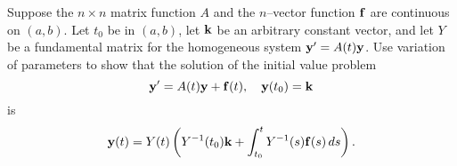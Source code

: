 \documentclass{ximera}
\begin{document}
 \begin{problem}\label{exer:10.7.23}
Suppose the $n\times n$ matrix function $A$ and the $n$--vector
function ${\bf f}$ are continuous on $(a,b)$. Let $t_0$ be in $(a,b)$,
let ${\bf k}$ be an arbitrary constant vector, and let $Y$ be a
fundamental matrix for the homogeneous system ${\bf y}'=A(t){\bf y}$.
Use variation of parameters to show that the solution of the initial
value problem
$$
{\bf y}'=A(t){\bf y}+{\bf f}(t),\quad {\bf y}(t_0)={\bf k}
$$
is
$$
{\bf y}(t)=Y(t)\left( Y^{-1}(t_0){\bf k}+\int_{t_0}^t
Y^{-1}(s){\bf f}(s)\, ds\right).
$$
\end{problem}
\end{document}
